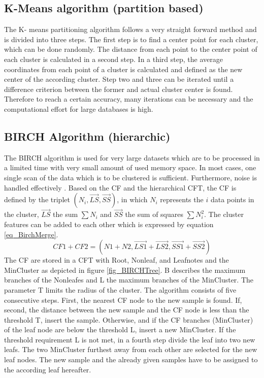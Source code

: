    \subsection{K-Means algorithm (partition based) }  \label{K-means}
   The K- means partitioning algorithm follows a very straight forward method and is divided into three steps. The first step is to find a center point for each cluster, which can be done randomly. The distance from each point to the center point of each cluster is calculated in a second step. In a third step, the average coordinates from each point of a cluster is calculated and defined as the new center of the according cluster. Step two and three can be iterated until a difference criterion between the former and actual cluster center is found. Therefore to reach a certain accuracy, many iterations can be necessary and the computational effort for large databases is high.
   \subsection{BIRCH Algorithm (hierarchic)} \label{Birch}
   The \ac{BIRCH} algorithm is used for very large datasets which are to be processed in a limited time with very small amount of used memory space. In most cases, one single scan of the data which is to be clustered is sufficient. Furthermore, noise is handled effectively \cite{BIRCH}.
   Based on the \ac{CF} and the hierarchical \ac{CFT}, the \ac{CF} is  defined by the triplet $(N_i, \vec{LS}, \vec{SS})$, in which $N_i$ represents the $i$ data points in the cluster, $\vec{LS}$ the sum $\sum N_i$ and $\vec{SS}$ the sum of squares $\sum N_i^2$. The cluster features can be added to each other which is expressed by equation \ref{eq_BirchMerge}.
   \begin{equation}
   \label{eq_BirchMerge}
   CF1+CF2=(N1+N2, \vec{LS1}+\vec{LS2}, \vec{SS1}+\vec{SS2})
   \end{equation}
    The \ac{CF} are stored in a \ac{CFT} with Root, Nonleaf, and Leafnotes and the MinCluster as depicted in figure \ref{fig_BIRCHTree}. B describes the maximum branches of the Nonleafes and L the maximum branches of the MinCluster. The parameter T limits the radius of the cluster. The algorithm consists of five consecutive steps. First, the nearest CF node to the new sample is found. If, second, the distance between the new sample and the CF node is less than the threshold T, insert the sample. Otherwise, and if the CF branches (MinCluster) of the leaf node are below the threshold L, insert a new MinCluster. If the threshold requirement L is not met, in a fourth step divide the leaf into two new leafs. The two MinCluster furthest away from each other are selected for the new leaf nodes. The new sample and the already given samples have to be assigned to the according leaf hereafter.
   

